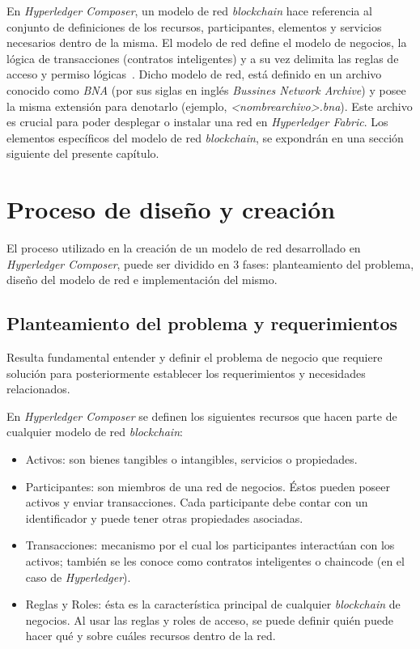 En \textit{Hyperledger Composer}, un modelo de red \textit{blockchain} hace referencia al conjunto de definiciones de los recursos, participantes, elementos y servicios necesarios  dentro de la misma. El modelo de red define el modelo de negocios, la lógica de transacciones (contratos inteligentes) y a su vez delimita las reglas de acceso y permiso lógicas~\cite{dhillon2017hyperledger}.  Dicho modelo de red, está definido en un archivo conocido como \textit{BNA} (por sus siglas en inglés {\it Bussines Network Archive}) y posee la misma extensión para denotarlo (ejemplo, \textit{<nombrearchivo>.bna}). Este archivo es crucial para poder desplegar o instalar una red en \textit{Hyperledger Fabric}. Los elementos específicos del modelo de red \textit{blockchain}, se expondrán en una sección siguiente del presente capítulo.

\section{Proceso de diseño y creación}

El proceso utilizado en la creación de un modelo de red desarrollado en \textit{Hyperledger Composer}, puede ser dividido en 3 fases: planteamiento del problema, diseño del modelo de red e implementación del mismo.

\subsection{Planteamiento del problema y requerimientos} 
Resulta fundamental entender y definir el problema de negocio que requiere solución para posteriormente establecer los requerimientos y necesidades relacionados. 

En \textit{Hyperledger Composer } se definen los siguientes recursos que hacen parte de cualquier modelo de red \textit{blockchain}:
\begin{itemize}
\item Activos: son bienes tangibles o intangibles, servicios o propiedades.
\item Participantes: son miembros de una red de negocios. Éstos pueden poseer activos y enviar transacciones. Cada participante debe contar con un identificador y puede tener otras propiedades asociadas.
\item Transacciones: mecanismo por el cual los participantes interactúan con los activos; también se les conoce como contratos inteligentes o chaincode (en el caso de \textit{Hyperledger}).
\item Reglas y Roles: ésta es la característica principal de cualquier \textit{blockchain} de negocios. Al usar las reglas y roles de acceso, se puede definir quién puede hacer qué y sobre cuáles recursos dentro de la red.
\end{itemize}


